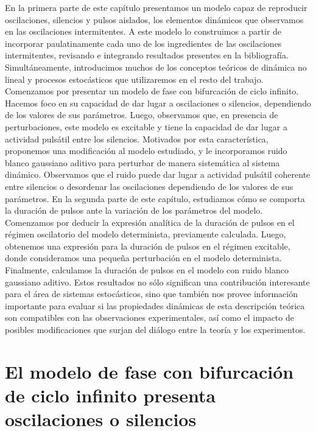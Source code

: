\documentclass[./main.tex]{subfiles}
\begin{document}
En la primera parte de este capítulo presentamos un modelo capaz de reproducir oscilaciones, silencios y pulsos aislados, los elementos dinámicos que observamos en las oscilaciones intermitentes. A este modelo lo construimos a partir de incorporar paulatinamente cada uno de los ingredientes de las oscilaciones intermitentes, revisando e integrando resultados presentes en la bibliografía. Simultáneamente, introducimos muchos de los conceptos teóricos de dinámica no lineal y procesos estocásticos que utilizaremos en el resto del trabajo. Comenzamos por presentar un modelo de fase con bifurcación de ciclo infinito. Hacemos foco en su capacidad de dar lugar a oscilaciones o silencios, dependiendo de los valores de sus parámetros. Luego, observamos que, en presencia de perturbaciones, este modelo es excitable y tiene la capacidad de dar lugar a actividad pulsátil entre los silencios. Motivados por esta característica, proponemos una modificación al modelo estudiado, y le incorporamos ruido blanco gaussiano aditivo para perturbar de manera sistemática al sistema dinámico. Observamos que el ruido puede dar lugar a actividad pulsátil coherente entre silencios o desordenar las oscilaciones dependiendo de los valores de sus parámetros. En la segunda parte de este capítulo, estudiamos cómo se comporta la duración de pulsos ante la variación de los parámetros del modelo. Comenzamos por deducir la expresión analítica de la duración de pulsos en el régimen oscilatorio del modelo determinista, previamente calculada. Luego, obtenemos una expresión para la duración de pulsos en el régimen excitable, donde consideramos una pequeña perturbación en el modelo determinista. Finalmente, calculamos la duración de pulsos en el modelo con ruido blanco gaussiano aditivo. Estos resultados no sólo significan una contribución interesante para el área de sistemas estocásticos, sino que también nos provee información importante para evaluar si las propiedades dinámicas de esta descripción teórica son compatibles con las observaciones experimentales, así como el impacto de posibles modificaciones que surjan del diálogo entre la teoría y los experimentos. 

\section{El modelo de fase con bifurcación de ciclo infinito presenta oscilaciones o silencios}
\label{C5_sec:osc_exc}
\end{document}
